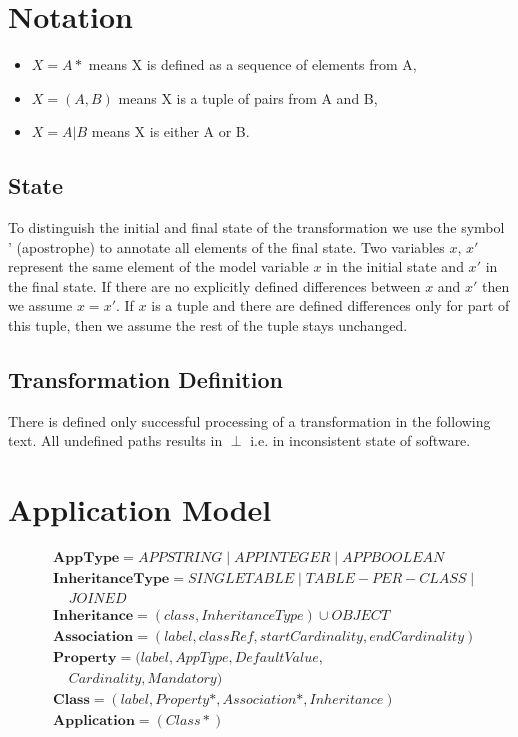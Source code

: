 \documentclass[10pt]{article}
\begin{document}

\section{Notation}

\begin{itemize}
    \item $X = A*$ means X is defined as a sequence of elements from A,
    \item $X = (A,B)$ means X is a tuple of pairs from A and B,
    \item $X = A | B$ means X is either A or B.
\end{itemize}

\subsection{State}
To distinguish the initial and final state of the transformation we use the symbol ' (apostrophe) to annotate all elements of the final state. Two variables $x$, $x'$ represent the same element of the model variable $x$ in the initial state and $x'$ in the final state. If there are no explicitly defined differences between $x$ and $x'$ then we assume $x = x'$. If $x$ is a tuple and there are defined differences only for part of this tuple, then we assume the rest of the tuple stays unchanged.

\subsection{Transformation Definition}
There is defined only successful processing of a transformation in the following text. All undefined paths results in $\perp$ i.e. in inconsistent state of software.


\section{Application Model}
\begin{align}
& \mathbf{AppType} = APPSTRING \;|\; APPINTEGER \;|\; APPBOOLEAN \\
& \mathbf{InheritanceType} = SINGLETABLE \; | \; TABLE-PER-CLASS  \; |  \; \\ & \;\;\;\;   JOINED\\
& \mathbf{Inheritance} = (class, InheritanceType) \cup OBJECT \\
& \mathbf{Association} = (label, classRef, startCardinality, endCardinality)  \\
& \mathbf{Property} = (label, AppType, DefaultValue, \nonumber \\ & \;\;\;\;  Cardinality, Mandatory) \\
& \mathbf{Class} = (label, Property*, Association*, Inheritance) \\
& \mathbf{Application} = (Class*) \\
\end{align}
\end{document}
